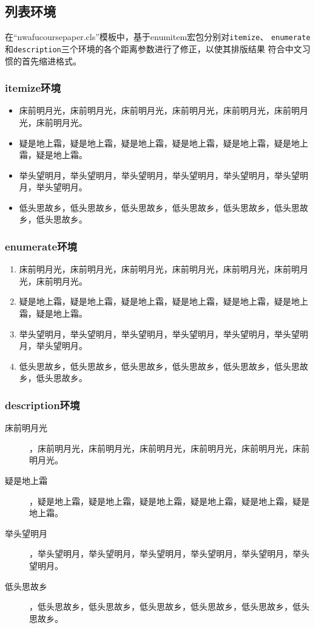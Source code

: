 \documentclass{nwafucoursepaper}
\begin{document}
\subsection{列表环境}
在\enquote{nwafucoursepaper.cls}模板中，基于enumitem宏包分别对\verb|itemize|、
\verb|enumerate|和\verb|description|三个环境的各个距离参数进行了修正，以使其排版结果
符合中文习惯的首先缩进格式。
\subsubsection{itemize环境}
\begin{itemize}
\item 床前明月光，床前明月光，床前明月光，床前明月光，床前明月光，床前明月光，床前明月光。
\item 疑是地上霜，疑是地上霜，疑是地上霜，疑是地上霜，疑是地上霜，疑是地上霜，疑是地上霜。
\item 举头望明月，举头望明月，举头望明月，举头望明月，举头望明月，举头望明月，举头望明月。
\item 低头思故乡，低头思故乡，低头思故乡，低头思故乡，低头思故乡，低头思故乡，低头思故乡。
\end{itemize}
\subsubsection{enumerate环境}
\begin{enumerate}
\item 床前明月光，床前明月光，床前明月光，床前明月光，床前明月光，床前明月光，床前明月光。
\item 疑是地上霜，疑是地上霜，疑是地上霜，疑是地上霜，疑是地上霜，疑是地上霜，疑是地上霜。
\item 举头望明月，举头望明月，举头望明月，举头望明月，举头望明月，举头望明月，举头望明月。
\item 低头思故乡，低头思故乡，低头思故乡，低头思故乡，低头思故乡，低头思故乡，低头思故乡。
\end{enumerate}
\subsubsection{description环境}
\begin{description}
\item[床前明月光]，床前明月光，床前明月光，床前明月光，床前明月光，床前明月光，床前明月光。
\item[疑是地上霜]，疑是地上霜，疑是地上霜，疑是地上霜，疑是地上霜，疑是地上霜，疑是地上霜。
\item[举头望明月]，举头望明月，举头望明月，举头望明月，举头望明月，举头望明月，举头望明月。
\item[低头思故乡]，低头思故乡，低头思故乡，低头思故乡，低头思故乡，低头思故乡，低头思故乡。
\end{description}
\end{document}
